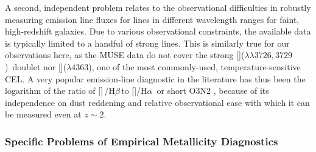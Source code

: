\documentclass[traditabstract, referee]{aa}
\newcommand{\hb}{H$\beta$}
\newcommand{\ha}{H$\alpha$}
\newcommand{\oii}{[\ion{O}{ii}]}
\newcommand{\oiii}{[\ion{O}{iii}]}
\newcommand{\nii}{[\ion{N}{ii}]}
\begin{document}
A second, independent problem relates to the observational difficulties in robustly measuring emission line fluxes for lines in different wavelength ranges for faint, high-redshift galaxies. Due to various observational constraints, the available data is typically limited to a handful of strong lines. This is similarly true for our observations here, as the MUSE data do not cover the strong \oii($\lambda\lambda3726,3729$)~doublet nor \oiii($\lambda 4363$), one of the most commonly-used, temperature-sensitive CEL. A very popular emission-line diagnostic in the literature has thus been the logarithm of the ratio of \oiii\,/\hb\,to \nii/\ha\, or short O3N2 \citep[e.g.][]{2004MNRAS.348L..59P, 2013A&A...559A.114M}, because of its independence on dust reddening and relative observational ease with which it can be measured even at $z\sim 2$.

\subsubsection{Specific Problems of Empirical Metallicity Diagnostics}
\end{document}
